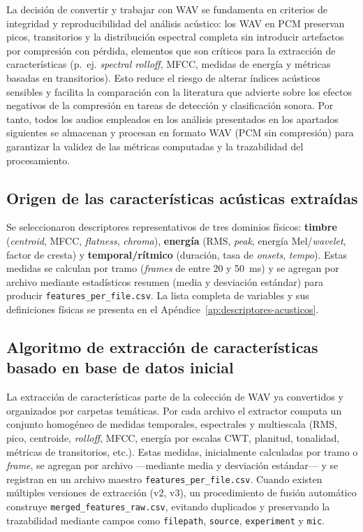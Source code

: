 \documentclass[12pt, letterpaper]{report}
\begin{document}
 La decisión de convertir y trabajar con WAV se fundamenta en criterios de integridad y reproducibilidad del análisis acústico: los WAV en PCM preservan picos, transitorios y la distribución espectral completa sin introducir artefactos por compresión con pérdida, elementos que son críticos para la extracción de características (p.~ej. \textit{spectral rolloff}, MFCC, medidas de energía y métricas basadas en transitorios). Esto reduce el riesgo de alterar índices acústicos sensibles y facilita la comparación con la literatura que advierte sobre los efectos negativos de la compresión en tareas de detección y clasificación sonora. Por tanto, todos los audios empleados en los análisis presentados en los apartados siguientes se almacenan y procesan en formato WAV (PCM sin compresión) para garantizar la validez de las métricas computadas y la trazabilidad del procesamiento.

\subsection{Origen de las características acústicas extraídas}

Se seleccionaron descriptores representativos de tres dominios físicos: \textbf{timbre} (\textit{centroid}, MFCC, \textit{flatness}, \textit{chroma}), \textbf{energía} (RMS, \textit{peak}, energía Mel/\textit{wavelet}, factor de cresta) y \textbf{temporal/rítmico} (duración, tasa de \textit{onsets}, \textit{tempo}). Estas medidas se calculan por tramo (\textit{frames} de entre 20 y 50~ms) y se agregan por archivo mediante estadísticos resumen (media y desviación estándar) para producir \texttt{features\_per\_file.csv}. La lista completa de variables y sus definiciones físicas se presenta en el Apéndice~\ref{ap:descriptores-acusticos}.

\subsection{Algoritmo de extracción de características basado en base de datos inicial}

\noindent La extracción de características parte de la colección de WAV ya convertidos y organizados por carpetas temáticas. Por cada archivo el extractor computa un conjunto homogéneo de medidas temporales, espectrales y multiescala (RMS, pico, centroide, \textit{rolloff}, MFCC, energía por escalas CWT, planitud, tonalidad, métricas de transitorios, etc.). Estas medidas, inicialmente calculadas por tramo o \textit{frame}, se agregan por archivo ---mediante media y desviación estándar--- y se registran en un archivo maestro \texttt{features\_per\_file.csv}. Cuando existen múltiples versiones de extracción (v2, v3), un procedimiento de fusión automático construye \texttt{merged\_features\_raw.csv}, evitando duplicados y preservando la trazabilidad mediante campos como \texttt{filepath}, \texttt{source}, \texttt{experiment} y \texttt{mic}.
\end{document}
